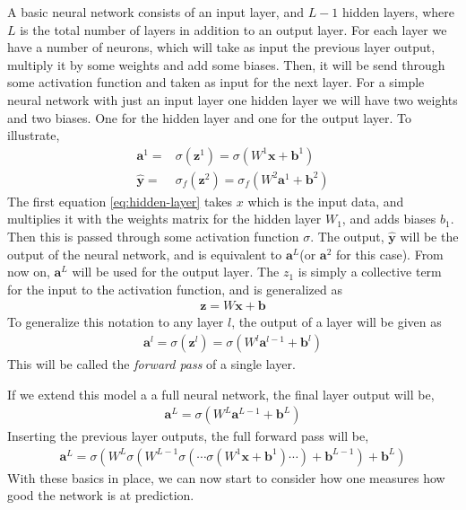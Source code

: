 \documentclass[a4paper,10pt]{article}
\begin{document}
A basic neural network consists of an input layer, and $L-1$ hidden layers, where $L$ is the total number of layers in addition to an output layer. For each layer we have a number of neurons, which will take as input the previous layer output, multiply it by some weights and add some biases. Then, it will be send through some activation function and taken as input for the next layer. For a simple neural network with just an input layer one hidden layer we will have two weights and two biases. One for the hidden layer and one for the output layer. To illustrate,
\begin{align}
    \bm{a}^1 =& \sigma(\bm{z}^1) = \sigma(W^1 \bm{x} + \bm{b}^1) \label{eq:hidden-layer} \\
    \hat{\bm{y}} =& \sigma_f(\bm{z}^2) = \sigma_f(W^2 \bm{a}^1 + \bm{b}^2) \label{eq:output-layer}
\end{align}
The first equation \eqref{eq:hidden-layer} takes $x$ which is the input data, and multiplies it with the weights matrix for the hidden layer $W_1$, and adds biases $b_1$. Then this is passed through some activation function $\sigma$. The output, $\hat{\bm{y}}$ will be the output of the neural network, and is equivalent to $\bm{a}^L$(or $\bm{a}^2$ for this case). From now on, $\bm{a}^L$ will be used for the output layer. The $z_1$ is simply a collective term for the input to the activation function, and is generalized as
\begin{align}
    \bm{z} = W\bm{x} + \bm{b}
    \label{eq:activation-input}
\end{align}
To generalize this notation to any layer $l$, the output of a layer will be given as 
\begin{align}
    \bm{a}^l = \sigma(\bm{z}^l) = \sigma(W^l\bm{a}^{l-1} + \bm{b}^l)
    \label{eq:forward-pass-single-layer}
\end{align}
This will be called the \textit{forward pass} of a single layer.

If we extend this model a a full neural network, the final layer output will be,
\begin{align}
    \bm{a}^L = \sigma(W^L\bm{a}^{L-1} + \bm{b}^L)
    \label{eq:final-layer-output}
\end{align}
Inserting the previous layer outputs, the full forward pass will be,
\begin{align}
    \bm{a}^L = \sigma(W^L\sigma(W^{L-1}\sigma(\cdots \sigma(W^{1}\bm{x} + \bm{b}^1) \cdots) + \bm{b}^{L-1}) + \bm{b}^L)
    \label{eq:full-forward-pass}
\end{align}
With these basics in place, we can now start to consider how one measures how good the network is at prediction.
\end{document}
